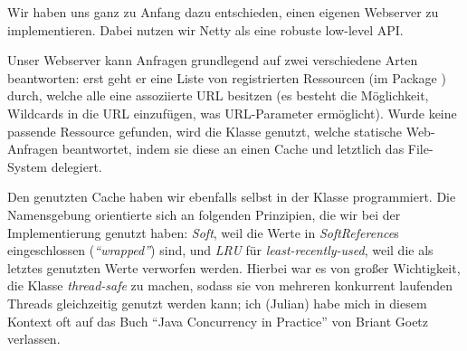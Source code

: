 Wir haben uns ganz zu Anfang dazu entschieden,
einen eigenen Webserver zu implementieren.
Dabei nutzen wir Netty als eine robuste low-level API.

Unser Webserver kann Anfragen grundlegend auf zwei verschiedene Arten beantworten:
erst geht er eine Liste von registrierten Ressourcen
(im Package )
durch,
welche alle eine assoziierte URL besitzen
(es besteht die Möglichkeit,
Wildcards in die URL einzufügen,
was URL-Parameter ermöglicht).
Wurde keine passende Ressource gefunden,
wird die Klasse  genutzt,
welche statische Web-Anfragen beantwortet,
indem sie diese an einen Cache und letztlich das File-System delegiert.

Den genutzten Cache haben wir ebenfalls selbst in der Klasse  programmiert.
Die Namensgebung orientierte sich an folgenden Prinzipien,
die wir bei der Implementierung genutzt haben:
\emph{Soft}, weil die Werte in \emph{SoftReference}s eingeschlossen (\emph{``wrapped''}) sind, und
\emph{LRU} für \emph{least-recently-used}, weil die als letztes genutzten Werte verworfen werden.
Hierbei war es von großer Wichtigkeit,
die Klasse \emph{thread-safe} zu machen,
sodass sie von mehreren konkurrent laufenden Threads gleichzeitig genutzt werden kann;
ich (Julian) habe mich in diesem Kontext oft auf das Buch ``Java Concurrency in Practice''
von Briant Goetz verlassen.
